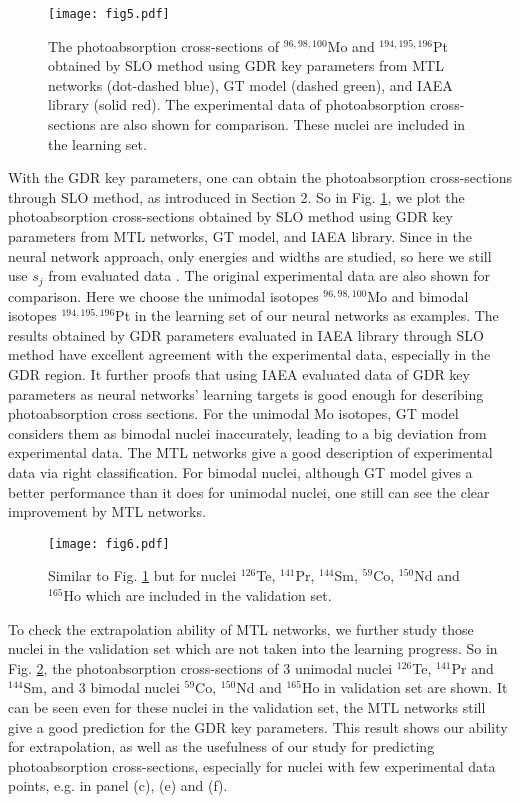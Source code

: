 \documentclass[twocolumn,showpacs,superscriptaddress,amsmath,amssymb,prc,preprintnumbers]{revtex4-1}
\begin{document}
\begin{figure}[htbp]\setlength{\abovecaptionskip}{0.0em}
\texttt{[image: fig5.pdf]}
\caption{
The photoabsorption cross-sections of $^{96,98,100}$Mo and $^{194,195,196}$Pt obtained by SLO method using GDR key parameters from MTL networks (dot-dashed blue), GT model \cite{RIPL3} (dashed green), and IAEA library \cite{Plujko2018} (solid red). The experimental data of photoabsorption cross-sections are also shown for comparison. These nuclei are included in the learning set.}\label{fig:fig5}
\end{figure}

With the GDR key parameters, one can obtain the photoabsorption cross-sections through SLO method, as introduced in Section 2. So in Fig. \ref{fig:fig5}, we plot the photoabsorption cross-sections obtained by SLO method using GDR key parameters from MTL networks, GT model, and IAEA library.  Since in the neural network approach, only energies and widths are studied, so here we still use $s_j$ from evaluated data \cite{Plujko2018}. The original experimental data are also shown for comparison. Here we choose the unimodal isotopes $^{96,98,100}$Mo and bimodal isotopes $^{194,195,196}$Pt in the learning set of our neural networks as examples. The results obtained by GDR parameters evaluated in IAEA library through SLO method have excellent agreement with the experimental data, especially in the GDR region. It further proofs that using IAEA evaluated data of GDR key parameters as neural networks' learning targets is good enough for describing photoabsorption cross sections. For the unimodal Mo isotopes, GT model considers them as bimodal nuclei inaccurately, leading to a big deviation from experimental data. The MTL networks give a good description of experimental data via right classification. For bimodal nuclei, although GT model gives a better performance than it does for unimodal nuclei, one still can see the clear improvement by MTL networks.

\begin{figure}[htbp]\setlength{\abovecaptionskip}{0.0em}
\texttt{[image: fig6.pdf]}
\caption{Similar to Fig. \ref{fig:fig5} but for nuclei $^{126}$Te, $^{141}$Pr, $^{144}$Sm, $^{59}$Co, $^{150}$Nd and $^{165}$Ho which  are included in the validation set. }\label{fig:fig6}
\end{figure}

To check the extrapolation ability of MTL networks, we further study those nuclei in the validation set which are not taken into the learning progress. So in Fig. \ref{fig:fig6}, the photoabsorption cross-sections of 3 unimodal nuclei $^{126}$Te, $^{141}$Pr and $^{144}$Sm, and 3 bimodal nuclei $^{59}$Co, $^{150}$Nd and $^{165}$Ho in validation set are shown. It can be seen even for these nuclei in the validation set, the MTL networks still give a good prediction for the GDR key parameters. This result shows our ability for extrapolation, as well as the usefulness of our study for predicting photoabsorption cross-sections, especially for nuclei with few experimental data points, e.g. in panel (c), (e) and (f).
\end{document}
